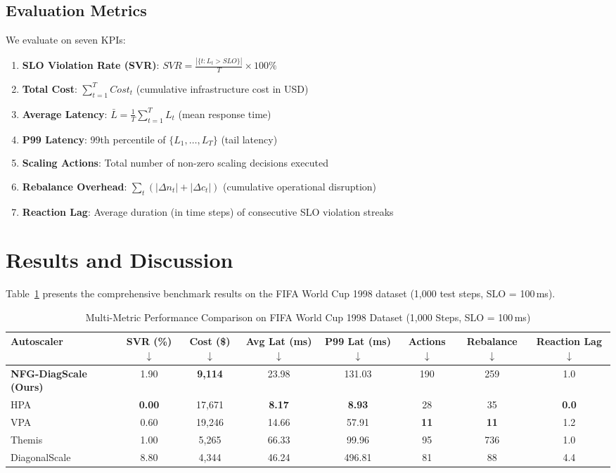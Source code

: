 \documentclass[conference]{IEEEtran}
\begin{document}
\subsection{Evaluation Metrics}

We evaluate on seven KPIs:

\begin{enumerate}
    \item \textbf{SLO Violation Rate (SVR)}: $SVR = \frac{|\{t : L_t > SLO\}|}{T} \times 100\%$
    \item \textbf{Total Cost}: $\sum_{t=1}^{T} Cost_t$ (cumulative infrastructure cost in USD)
    \item \textbf{Average Latency}: $\bar{L} = \frac{1}{T}\sum_{t=1}^{T} L_t$ (mean response time)
    \item \textbf{P99 Latency}: 99th percentile of $\{L_1, \ldots, L_T\}$ (tail latency)
    \item \textbf{Scaling Actions}: Total number of non-zero scaling decisions executed
    \item \textbf{Rebalance Overhead}: $\sum_t (|\Delta n_t| + |\Delta c_t|)$ (cumulative operational disruption)
    \item \textbf{Reaction Lag}: Average duration (in time steps) of consecutive SLO violation streaks
\end{enumerate}

\section{Results and Discussion}
\label{sec:results}

Table~\ref{tab:results} presents the comprehensive benchmark results on the FIFA World Cup 1998 dataset (1,000 test steps, SLO = 100\,ms).

\begin{table}[t]
\centering
\caption{Multi-Metric Performance Comparison on FIFA World Cup 1998 Dataset (1,000 Steps, SLO = 100\,ms)}
\label{tab:results}
\begin{tabular}{l|c|c|c|c|c|c|c}
\toprule
\textbf{Autoscaler} & \textbf{SVR (\%)} $\downarrow$ & \textbf{Cost (\$)} $\downarrow$ & \textbf{Avg Lat (ms)} $\downarrow$ & \textbf{P99 Lat (ms)} $\downarrow$ & \textbf{Actions} $\downarrow$ & \textbf{Rebalance} $\downarrow$ & \textbf{Reaction Lag} $\downarrow$ \\
\midrule
\textbf{NFG-DiagScale (Ours)} & 1.90 & \textbf{9,114} & 23.98 & 131.03 & 190 & 259 & 1.0 \\
HPA & \textbf{0.00} & 17,671 & \textbf{8.17} & \textbf{8.93} & 28 & 35 & \textbf{0.0} \\
VPA & 0.60 & 19,246 & 14.66 & 57.91 & \textbf{11} & \textbf{11} & 1.2 \\
Themis & 1.00 & 5,265 & 66.33 & 99.96 & 95 & 736 & 1.0 \\
DiagonalScale & 8.80 & 4,344 & 46.24 & 496.81 & 81 & 88 & 4.4 \\
\bottomrule
\end{tabular}
\end{table}
\end{document}
